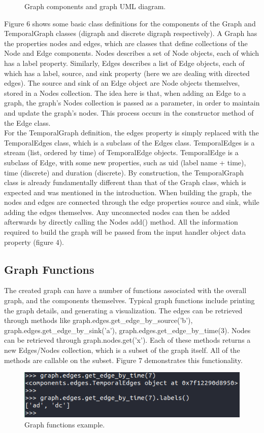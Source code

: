 \begin{design}
\begin{figure}[t]
    \caption{Graph components and graph UML diagram.}
\end{figure}
Figure 6 shows some basic class definitions for the components of the Graph and TemporalGraph classes (digraph and discrete digraph respectively). A Graph has the properties nodes and edges, which are classes that define collections of the Node and Edge components. Nodes describes a set of Node objects, each of which has a label property. Similarly, Edges describes a list of Edge objects, each of which has a label, source, and sink property (here we are dealing with directed edges). The source and sink of an Edge object are Node objects themselves, stored in a Nodes collection. The idea here is that, when adding an Edge to a graph, the graph's Nodes collection is passed as a parameter, in order to maintain and update the graph's nodes. This process occurs in the constructor method of the Edge class.\\
For the TemporalGraph definition, the edges property is simply replaced with the TemporalEdges class, which is a subclass of the Edges class. TemporalEdges is a stream (list, ordered by time) of TemporalEdge objects. TemporalEdge is a subclass of Edge, with some new properties, such as uid (label name + time), time (discrete) and duration (discrete). By construction, the TemporalGraph class is already fundamentally different than that of the Graph class, which is expected and was mentioned in the introduction. When building the graph, the nodes and edges are connected through the edge properties source and sink, while adding the edges themselves. Any unconnected nodes can then be added afterwards by directly calling the Nodes add() method. All the information required to build the graph will be passed from the input handler object data property (figure 4).
\subsection{Graph Functions}
The created graph can have a number of functions associated with the overall graph, and the components themselves. Typical graph functions include printing the graph details, and generating a visualization. The edges can be retrieved through methods like graph.edges.get\_edge\_by\_source('b'), graph.edges.get\_edge\_by\_sink('a'), graph.edges.get\_edge\_by\_time(3). Nodes can be retrieved through graph.nodes.get('x'). Each of these methods returns a new Edges/Nodes collection, which is a subset of the graph itself. All of the methods are callable on the subset. Figure 7 demonstrates this functionality.
\begin{figure}[h]
    \centering
    \includegraphics[scale=0.7]{images/graph_get_edge_labels.PNG}
    \caption{Graph functions example.}
\end{figure}


\end{design}
